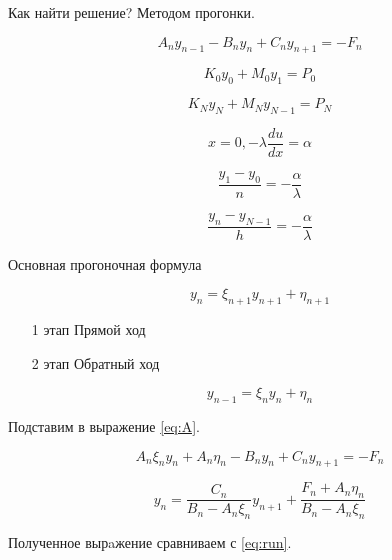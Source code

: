 Как найти решение? Методом прогонки.

\begin{equation}\label{eq:A}
    A_n y_{n-1} - B_n y_n + C_n y_{n+1} = - F_n
\end{equation}

\begin{equation}\label{eq:K0}
    K_0y_0 + M_0y_1 = P_0
\end{equation}

\begin{equation}\label{eq:KN}
    K_Ny_N + M_Ny_{N-1} = P_N
\end{equation}

\begin{equation*}
    x=0, -\lambda \frac{du}{dx} = \alpha
\end{equation*}

\begin{equation*}
    \frac{y_1 - y_0}{n} = - \frac{\alpha}{\lambda}
\end{equation*}

\begin{equation*}
    \frac{y_n - y_{N-1}}{h} = -\frac{\alpha}{\lambda}
\end{equation*}

Основная прогоночная формула

\begin{equation}\label{eq:run}
    y_n = \xi_{n+1} y_{n+1} + \eta_{n+1}
\end{equation}

\begin{enumerate}
    \item[1 этап] Прямой ход
    \item[2 этап] Обратный ход
\end{enumerate}

\begin{equation*}
    y_{n-1} = \xi_ny_n + \eta_n
\end{equation*}

Подставим в выражение \ref{eq:A}.

\begin{equation*}
    A_n \xi_n y_n + A_n \eta_n - B_n y_n + C_n y_{n+1} = -F_n
\end{equation*}

\begin{equation*}
    y_n = \frac{C_n}{B_n - A_n \xi_n} y_{n+1} +
          \frac{F_n + A_n\eta_n}{B_n - A_n\xi_n}
\end{equation*}

Полученное вырaжение сравниваем с \ref{eq:run}.

